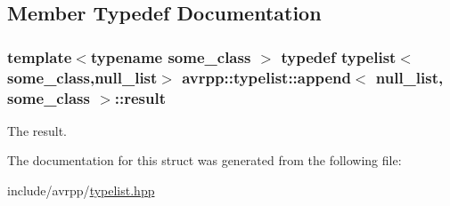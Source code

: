 \subsection{Member Typedef Documentation}
\hypertarget{structavrpp_1_1typelist_1_1append_3_01null__list_00_01some__class_01_4_a22b468f1cf76b305fe9dd5665e8d5d13}{
\subsubsection[{result}]{\setlength{\rightskip}{0pt plus 5cm}template$<$typename some\_\-class $>$ typedef {\bf typelist}$<$some\_\-class,{\bf null\_\-list}$>$ avrpp::typelist::append$<$ {\bf null\_\-list}, some\_\-class $>$::{\bf result}}}
\label{structavrpp_1_1typelist_1_1append_3_01null__list_00_01some__class_01_4_a22b468f1cf76b305fe9dd5665e8d5d13}


The result. 



The documentation for this struct was generated from the following file:\begin{DoxyCompactItemize}
\item 
include/avrpp/\hyperlink{typelist_8hpp}{typelist.hpp}\end{DoxyCompactItemize}
